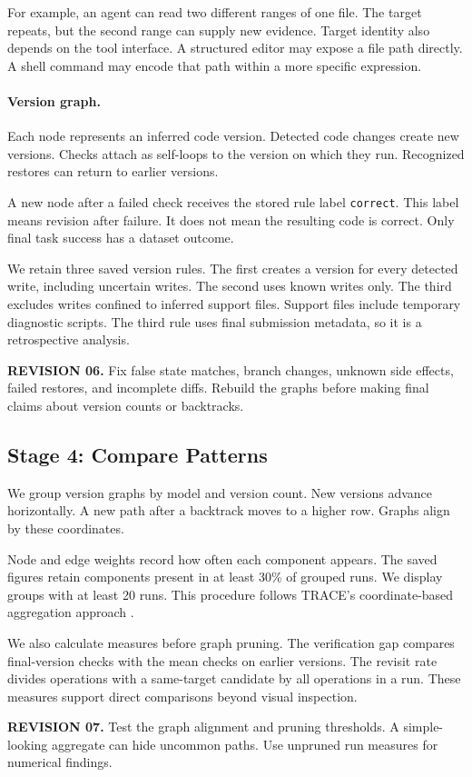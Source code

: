 \documentclass[10pt,a4paper,twocolumn]{article}
\newcommand{\rev}[2]{\par\smallskip\noindent\begin{minipage}{\linewidth}\color{revision}\footnotesize\textbf{REVISION #1.} #2\end{minipage}\par\smallskip}
\begin{document}
For example, an agent can read two different ranges of one file. The target repeats, but the second range can supply new evidence. Target identity also depends on the tool interface. A structured editor may expose a file path directly. A shell command may encode that path within a more specific expression.

\paragraph{Version graph.}
Each node represents an inferred code version. Detected code changes create new versions. Checks attach as self-loops to the version on which they run. Recognized restores can return to earlier versions.

A new node after a failed check receives the stored rule label \texttt{correct}. This label means revision after failure. It does not mean the resulting code is correct. Only final task success has a dataset outcome.

We retain three saved version rules. The first creates a version for every detected write, including uncertain writes. The second uses known writes only. The third excludes writes confined to inferred support files. Support files include temporary diagnostic scripts. The third rule uses final submission metadata, so it is a retrospective analysis.
\rev{06}{Fix false state matches, branch changes, unknown side effects, failed restores, and incomplete diffs. Rebuild the graphs before making final claims about version counts or backtracks.}

\subsection{Stage 4: Compare Patterns}
We group version graphs by model and version count. New versions advance horizontally. A new path after a backtrack moves to a higher row. Graphs align by these coordinates.

Node and edge weights record how often each component appears. The saved figures retain components present in at least 30\% of grouped runs. We display groups with at least 20 runs. This procedure follows TRACE's coordinate-based aggregation approach \citep{trace}.

We also calculate measures before graph pruning. The verification gap compares final-version checks with the mean checks on earlier versions. The revisit rate divides operations with a same-target candidate by all operations in a run. These measures support direct comparisons beyond visual inspection.
\rev{07}{Test the graph alignment and pruning thresholds. A simple-looking aggregate can hide uncommon paths. Use unpruned run measures for numerical findings.}
\end{document}
